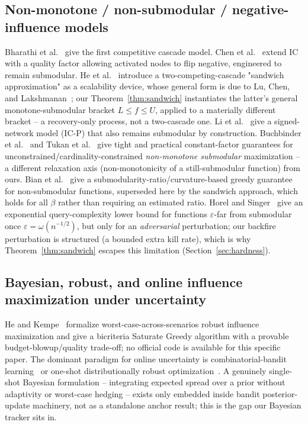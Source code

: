 \documentclass[journal]{IEEEtran}
\begin{document}
\subsection{Non-monotone / non-submodular / negative-influence models}
Bharathi et al.~\cite{bharathi2007competitive} give the first competitive
cascade model. Chen et al.~\cite{chen2011influence} extend IC with a quality
factor allowing activated nodes to flip negative, engineered to remain
submodular. He et al.~\cite{he2012influence} introduce a two-competing-cascade
"sandwich approximation" as a scalability device, whose general form is due
to Lu, Chen, and Lakshmanan~\cite{lu2015competition}; our
Theorem~\ref{thm:sandwich} instantiates the latter's general
monotone-submodular bracket $L\le f\le U$, applied to a materially different
bracket -- a recovery-only process, not a two-cascade one. Li et
al.~\cite{li2014influence} give a signed-network model (IC-P) that also
remains submodular by construction. Buchbinder et
al.~\cite{buchbinder2015tight} and Tukan et al.~\cite{tukan2024practical} give
tight and practical constant-factor guarantees for unconstrained/cardinality-constrained
\emph{non-monotone submodular} maximization -- a different relaxation
axis (non-monotonicity of a still-submodular function) from ours. Bian et
al.~\cite{bian2017guarantees} give a submodularity-ratio/curvature-based
greedy guarantee for non-submodular functions, superseded here by the
sandwich approach, which holds for all $\beta$ rather than requiring an
estimated ratio. Horel and Singer~\cite{horel2016maximization} give an
exponential query-complexity lower bound for functions
$\varepsilon$-far from submodular once $\varepsilon=\omega(n^{-1/2})$, but
only for an \emph{adversarial} perturbation; our backfire perturbation is
structured (a bounded extra kill rate), which is why Theorem~\ref{thm:sandwich}
escapes this limitation (Section~\ref{sec:hardness}).

\subsection{Bayesian, robust, and online influence maximization under uncertainty}
He and Kempe~\cite{he2016robust} formalize worst-case-across-scenarios robust
influence maximization and give a bicriteria Saturate Greedy algorithm with a
provable budget-blowup/quality trade-off; no official code is available for
this specific paper. The dominant paradigm for online uncertainty is
combinatorial-bandit learning~\cite{vaswani2015influence,wen2017online,lei2015online,vaswani2017modelindependent,chen2013combinatorial,chen2016combinatorial}
or one-shot distributionally robust
optimization~\cite{chen2020correlation,staib2019distributionally}. A
genuinely single-shot Bayesian formulation -- integrating expected spread
over a prior without adaptivity or worst-case hedging -- exists only
embedded inside bandit posterior-update machinery, not as a standalone
anchor result; this is the gap our Bayesian tracker sits in.
\end{document}
